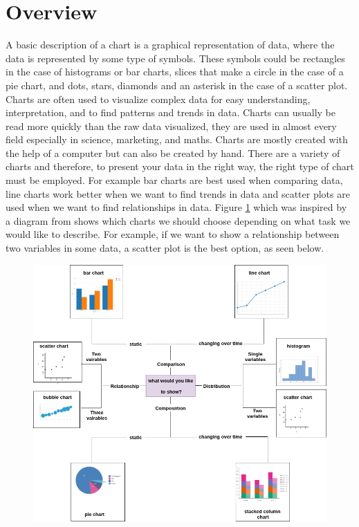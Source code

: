 \documentclass[12pt, a4paper,oneside]{report}
\begin{document}
\section{Overview} 
A basic description of a chart is a graphical representation of data, where the data is represented by some type of symbols. These symbols could be rectangles in the case of histograms or bar charts,  slices that make a circle in the case of a pie chart, and dots, stars, diamonds and an asterisk in the case of a scatter plot. Charts are often used to visualize complex data for easy understanding, interpretation, and to find patterns and trends in data. Charts can usually be read more quickly than the raw data visualized, they are used in almost every field especially in science, marketing, and maths. Charts are mostly created with the help of a computer but can also be created by hand. There are a variety of charts and therefore, to present your data in the right way, the right type of chart must be employed. For example bar charts are best used when comparing data, line charts work better when we want to find trends in data and scatter plots are used when we want to find relationships in data. Figure \ref{fig:chartse} which was inspired by a diagram from \cite{chartselection} shows which charts we should choose depending on what task we would like to describe. For example, if we want to show a relationship between two variables in some data, a scatter plot is the best option, as seen below.\\

\begin{figure}[!htb]
	\centering
	\includegraphics [scale=0.5] {chart}
	\label{fig:chartse}
\end{figure}
\end{document}
